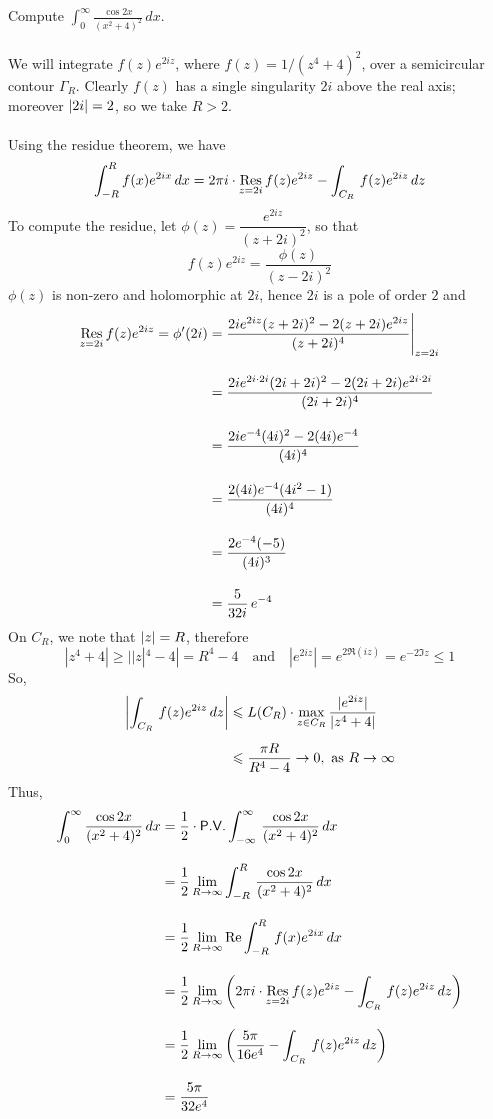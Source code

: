 \begin{example}
Compute $\displaystyle \int_0^\infty\frac{\cos 2x}{(x^2 + 4)^2}\,dx$.\\
\\
We will integrate $f(z)e^{2iz}$, where $f(z) = 1/(z^4 + 4)^2$, over a semicircular contour $\Gamma_R$. Clearly $f(z)$ has a single singularity $2i$ above the real axis; moreover $\left\lvert2i\right\rvert = 2$, so we take $R > 2$.\\
\\
Using the residue theorem, we have
\[\int_{-R}^Rf(x)e^{2ix}\,dx = 2\pi i\cdot\underset{z = {2i}}{\operatorname{Res}}\,f(z)e^{2iz} - \int_{C_R}\,f(z)e^{2iz}\,dz\]
To compute the residue, let $\phi(z) = \dfrac{e^{2iz}}{(z + 2i)^2}$, so that
\[f(z)e^{2iz} = \frac{\phi(z)}{(z - 2i)^2}\]
$\phi(z)$ is non-zero and holomorphic at $2i$, hence $2i$ is a pole of order $2$ and
\begin{align*}
\underset{z = {2i}}{\operatorname{Res}}\,f(z)e^{2iz} = \phi'(2i) &= \frac{2ie^{2iz}(z + 2i)^2 - 2(z + 2i)e^{2iz}}{(z + 2i)^4}\Bigg\vert_{z = 2i}\\[1em]
 &= \frac{2ie^{2i\cdot 2i}(2i + 2i)^2 - 2(2i + 2i)e^{2i\cdot 2i}}{(2i + 2i)^4}\\[1em]
 &= \frac{2ie^{-4}(4i)^2 - 2(4i)e^{-4}}{(4i)^4}\\[1em]
 &= \frac{2(4i)e^{-4}(4i^2 - 1)}{(4i)^4}\\[1em]
 &= \frac{2e^{-4}(-5)}{(4i)^3}\\[1em]
 &= \frac{5}{32i}\,e^{-4}
\end{align*}
On $C_R$, we note that $\left\lvert z\right\rvert = R$, therefore 
\[|z^4 + 4| \geq ||z|^4 - 4| = R^4 - 4 \quad \text{and} \quad |e^{2iz}| = e^{2\Re(iz)} = e^{-2\Im z} \leq 1\]
So,
\begin{align*}
\left\lvert\int_{C_R}\,f(z)e^{2iz}\,dz\right\rvert &\leqslant L(C_R)\cdot \max_{z \in C_R}\frac{|e^{2iz}|}{|z^4 + 4|}\\[0.5em]
 &\leqslant \frac{\pi R}{R^4 - 4} \to 0,\ \text{as }R \to \infty
\end{align*}
Thus,
\begin{align*}
\int_0^\infty\frac{\cos 2x}{(x^2 + 4)^2}\,dx &= \frac{1}{2}\cdot\mathsf{P.V.}\int_{-\infty}^\infty\,\frac{\cos 2x}{(x^2 + 4)^2}\,dx\\[1em]
 &= \frac{1}{2}\lim_{R \to \infty}\int_{-R}^R\,\frac{\cos 2x}{(x^2 + 4)^2}\,dx\\[1em]
 &= \frac{1}{2}\lim_{R \to \infty}\operatorname{Re}\int_{-R}^R\,f(x)e^{2ix}\,dx\\[1em]
 &= \frac{1}{2}\lim_{R \to \infty}\left(2\pi i\cdot \underset{z = {2i}}{\operatorname{Res}}\,f(z)e^{2iz} - \int_{C_R}\,f(z)e^{2iz}\,dz\right)\\[1em]
 &= \frac{1}{2}\lim_{R \to \infty}\left(\frac{5\pi}{16e^4} - \int_{C_R}\,f(z)e^{2iz}\,dz\right)\\[1em]
 &= \frac{5\pi}{32e^4}
\end{align*}
\end{example}

